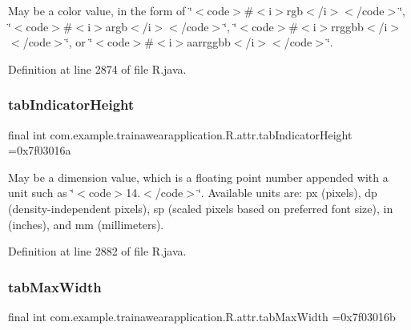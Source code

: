 May be a color value, in the form of \char`\"{}$<$code$>$\#$<$i$>$rgb$<$/i$>$$<$/code$>$\char`\"{}, \char`\"{}$<$code$>$\#$<$i$>$argb$<$/i$>$$<$/code$>$\char`\"{}, \char`\"{}$<$code$>$\#$<$i$>$rrggbb$<$/i$>$$<$/code$>$\char`\"{}, or \char`\"{}$<$code$>$\#$<$i$>$aarrggbb$<$/i$>$$<$/code$>$\char`\"{}. 

Definition at line 2874 of file R.\+java.

\mbox{\label{classcom_1_1example_1_1trainawearapplication_1_1_r_1_1attr_a8df20a36259c674fbacb811e1e5f96dd}} 
\subsubsection{\texorpdfstring{tabIndicatorHeight}{tabIndicatorHeight}}
{\footnotesize\ttfamily final int com.\+example.\+trainawearapplication.\+R.\+attr.\+tab\+Indicator\+Height =0x7f03016a\hspace{0.3cm}{\ttfamily [static]}}

May be a dimension value, which is a floating point number appended with a unit such as \char`\"{}$<$code$>$14.\+5sp$<$/code$>$\char`\"{}. Available units are\+: px (pixels), dp (density-\/independent pixels), sp (scaled pixels based on preferred font size), in (inches), and mm (millimeters). 

Definition at line 2882 of file R.\+java.

\mbox{\label{classcom_1_1example_1_1trainawearapplication_1_1_r_1_1attr_adeddc39b55eccd7dcb3e55484b70911a}} 
\subsubsection{\texorpdfstring{tabMaxWidth}{tabMaxWidth}}
{\footnotesize\ttfamily final int com.\+example.\+trainawearapplication.\+R.\+attr.\+tab\+Max\+Width =0x7f03016b\hspace{0.3cm}{\ttfamily [static]}}

